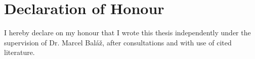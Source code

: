 \thispagestyle{empty}
\vspace*{\fill}
\section*{Declaration of Honour}

I hereby declare on my honour that I wrote this thesis independently under the supervision of Dr. Marcel Baláž, after consultations and with use of cited literature.

\vspace{3\medskipamount}\noindent
\SignPlace \SignDateEN \hspace*{\fill} \signaturespace{5cm}{\Author} 
